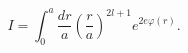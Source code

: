 \begin{equation}
\label{Eq_A01}
I = \int^a_0 \frac{dr}{a}
  \left(\frac{r}{a}\right)^{2l+1} e^{2e \varphi(r)}.
\end{equation}

